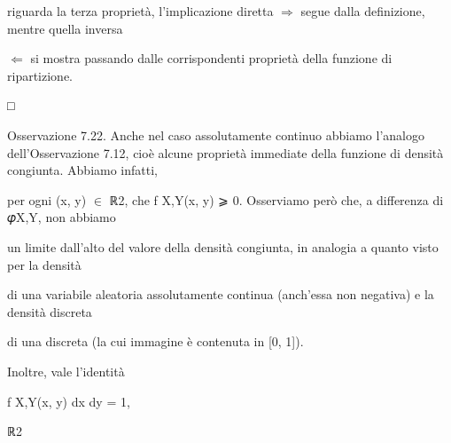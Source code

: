 \documentclass[a4paper,portrait,12pt]{article}
\begin{document}
\begin{flushleft}
riguarda la terza propriet\`{a}, l'implicazione diretta $\Rightarrow$ segue dalla definizione, mentre quella inversa
\end{flushleft}


\begin{flushleft}
$\Leftarrow$ si mostra passando dalle corrispondenti propriet\`{a} della funzione di ripartizione.
\end{flushleft}


□





\begin{flushleft}
Osservazione 7.22. Anche nel caso assolutamente continuo abbiamo l'analogo dell'Osservazione 7.12, cio\`{e} alcune propriet\`{a} immediate della funzione di densit\`{a} congiunta. Abbiamo infatti,
\end{flushleft}


\begin{flushleft}
per ogni (x, y) $\in$ ℝ2, che f X,Y(x, y) ⩾ 0. Osserviamo per\`{o} che, a differenza di 𝜑X,Y, non abbiamo
\end{flushleft}


\begin{flushleft}
un limite dall'alto del valore della densit\`{a} congiunta, in analogia a quanto visto per la densit\`{a}
\end{flushleft}


\begin{flushleft}
di una variabile aleatoria assolutamente continua (anch'essa non negativa) e la densit\`{a} discreta
\end{flushleft}


\begin{flushleft}
di una discreta (la cui immagine \`{e} contenuta in [0, 1]).
\end{flushleft}


\begin{flushleft}
Inoltre, vale l'identit\`{a}
\end{flushleft}


\begin{flushleft}
f X,Y(x, y) dx dy = 1,
\end{flushleft}





\begin{flushleft}
ℝ2
\end{flushleft}
\end{document}
